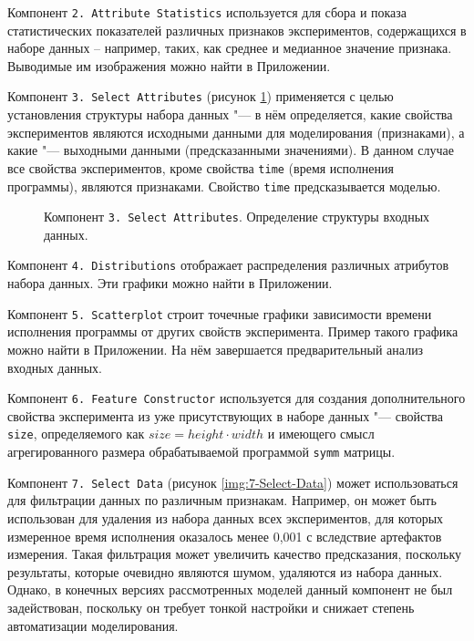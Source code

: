 Компонент \texttt{2.\,Attribute~Statistics} используется для сбора и показа статистических показателей различных признаков экспериментов, содержащихся в наборе данных -- например, таких, как среднее и медианное значение признака. Выводимые им изображения можно найти в Приложении.

Компонент \texttt{3.\,Select~Attributes} (рисунок \ref{img:3-Select-Attributes}) применяется с целью установления структуры набора данных "--- в нём определяется, какие свойства экспериментов являются исходными данными для моделирования (признаками), а какие "--- выходными данными (предсказанными значениями). В данном случае все свойства экспериментов, кроме свойства \texttt{time} (время исполнения программы), являются признаками. Свойство \texttt{time} предсказывается моделью.

\begin{figure}[tbp]
    \caption{Компонент \texttt{3.\,Select~Attributes}. Определение структуры входных данных.}
    \label{img:3-Select-Attributes}
\end{figure}

Компонент \texttt{4.\,Distributions} отображает распределения различных атрибутов набора данных. Эти графики можно найти в Приложении.

Компонент \texttt{5.\,Scatterplot} строит точечные графики зависимости времени исполнения программы от других свойств эксперимента. Пример такого графика можно найти в Приложении. На нём завершается предварительный анализ входных данных.

Компонент \texttt{6.\,Feature Constructor} используется для создания дополнительного свойства эксперимента из уже присутствующих в наборе данных "--- свойства \texttt{size}, определяемого как $size = height \cdot width$ и имеющего смысл агрегированного размера обрабатываемой программой \texttt{symm} матрицы.

Компонент \texttt{7.\,Select~Data} (рисунок \ref{img:7-Select-Data}) может использоваться для фильтрации данных по различным признакам. Например, он может быть использован для удаления из набора данных всех экспериментов, для которых измеренное время исполнения оказалось менее 0,001 с вследствие артефактов измерения. Такая фильтрация может увеличить качество предсказания, поскольку результаты, которые очевидно являются шумом, удаляются из набора данных. Однако, в конечных версиях рассмотренных моделей данный компонент не был задействован, поскольку он требует тонкой настройки и снижает степень автоматизации моделирования.


